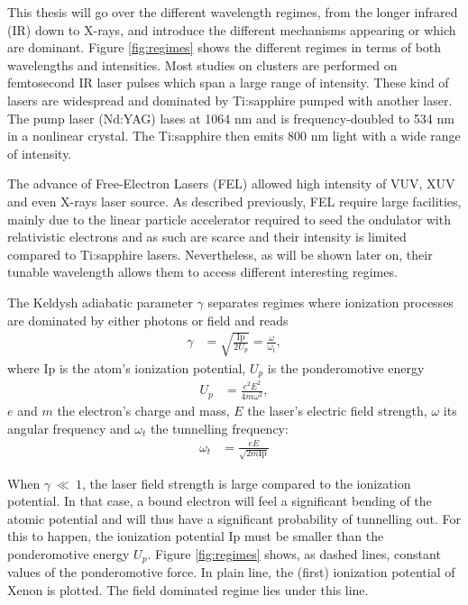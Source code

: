 This thesis will go over the different wavelength regimes, from the longer
infrared (IR) down to X-rays, and introduce the different mechanisms
appearing or which are dominant.
Figure
\ref{fig:regimes} shows the different regimes in terms of both wavelengths and
intensities. Most studies on clusters are performed on femtosecond IR laser
pulses which span a large range of intensity. These kind of lasers are
widespread and dominated by Ti:sapphire pumped with another laser. The pump
laser (Nd:YAG) lases at 1064 nm and is frequency-doubled to 534 nm in a
nonlinear crystal. The Ti:sapphire then emits 800 nm light with a wide range of
intensity.

The advance of Free-Electron Lasers (FEL) allowed high intensity of VUV, XUV and
even X-rays laser source. As described previously, FEL require large facilities,
mainly due to the linear particle accelerator required to seed the ondulator
with relativistic electrons and as such are scarce and their intensity is limited
compared to Ti:sapphire lasers. Nevertheless, as will be shown later on, their
tunable wavelength allows them to access different interesting regimes.

The Keldysh adiabatic parameter $\gamma$ separates regimes where ionization
processes are dominated by either photons or field\cite{Long2010} and reads
\begin{align}
\gamma & = \sqrt{ \frac{\textrm{Ip}}{2 U_p} } = \frac{\omega}{\omega_t},
\end{align}
where Ip is the atom's ionization potential, $U_p$ is the ponderomotive energy
\begin{align}
U_p & = \frac{e^2 E^2}{4 m \omega^2},
\end{align}
$e$ and $m$ the electron's charge and mass, $E$ the laser's electric field
strength, $\omega$ its angular frequency and $\omega_t$ the tunnelling
frequency:
\begin{align}
\omega_t & = \frac{e E}{\sqrt{2 m \textrm{Ip}}}
\end{align}


When $\gamma~\ll~1$, the laser field strength is large compared to the ionization
potential. In that case, a bound electron will feel a significant bending of the
atomic potential and will thus have a significant probability of tunnelling out.
For this to happen, the ionization potential Ip must be
smaller than the ponderomotive energy $U_p$. Figure \ref{fig:regimes} shows,
as dashed lines, constant values of the ponderomotive force. In plain line,
the (first) ionization potential of Xenon is plotted. The field dominated regime
lies under this line.

